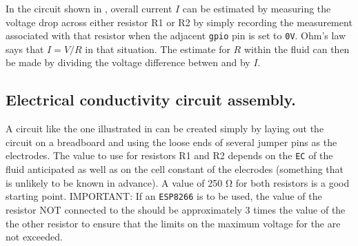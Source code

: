 In the circuit shown in , overall current $I$ can be estimated by measuring the voltage drop across either resistor R1 or R2 by simply recording the \adc measurement associated with that resistor when the adjacent \texttt{gpio} pin is set to \texttt{0V}.  Ohm's law says that $I = V/R$ in that situation. The estimate for $R$ within the fluid can then be made by dividing the voltage difference betwen  and  by $I$.  

\subsection{Electrical conductivity circuit assembly.}

A circuit like the one illustrated in  can be created simply by laying out the circuit on a breadboard and using the loose ends of several jumper pins as the electrodes. The value to use for resistors R1 and R2 depends on the \texttt{EC} of the fluid anticipated as well as on the cell constant of the elecrodes (something that is unlikely to be known in advance).  A value of 250 \si{\ohm} for both resistors is a good starting point. IMPORTANT:  If an \texttt{ESP8266} is to be used, the value of the resistor NOT connected to the \adc should be approximately 3 times the value of the the other resistor to ensure that the limits on the maximum voltage for the \adc are not exceeded.

